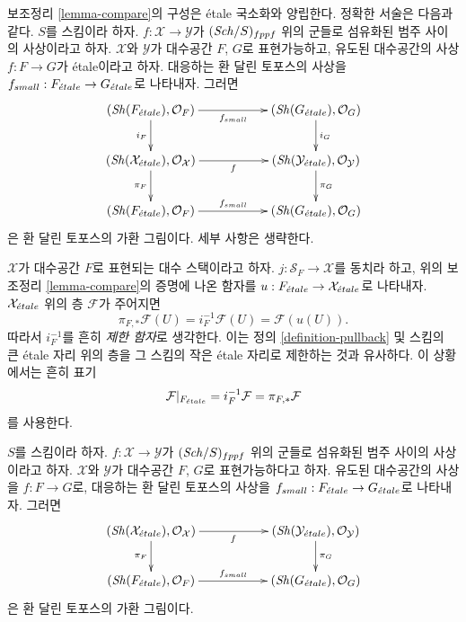 \begin{remark}
\label{remark-compare}
보조정리 \ref{lemma-compare}의 구성은 \'etale 국소화와 양립한다.
정확한 서술은 다음과 같다. $S$를 스킴이라 하자.
$f : \mathcal{X} \to \mathcal{Y}$가 $(\mathit{Sch}/S)_{fppf}$ 위의
군들로 섬유화된 범주 사이의 사상이라고 하자.
$\mathcal{X}$와 $\mathcal{Y}$가 대수공간 $F$, $G$로 표현가능하고,
유도된 대수공간의 사상 $f : F \to G$가 \'etale이라고 하자.
대응하는 환 달린 토포스의 사상을
$f_{small} : F_{\acute{e}tale} \to G_{\acute{e}tale}$로 나타내자. 그러면
$$
\xymatrix{
(\Sh(F_\etale), \mathcal{O}_F) \ar[rr]_{f_{small}} \ar[d]_{i_F} & &
(\Sh(G_\etale), \mathcal{O}_G) \ar[d]^{i_G} \\
(\Sh(\mathcal{X}_\etale), \mathcal{O}_\mathcal{X})
\ar[d]_{\pi_F} \ar[rr]_f & &
(\Sh(\mathcal{Y}_\etale), \mathcal{O}_\mathcal{Y}) \ar[d]^{\pi_G} \\
(\Sh(F_\etale), \mathcal{O}_F) \ar[rr]^{f_{small}} & &
(\Sh(G_\etale), \mathcal{O}_G)
}
$$
은 환 달린 토포스의 가환 그림이다. 세부 사항은 생략한다.
\end{remark}

\noindent
$\mathcal{X}$가 대수공간 $F$로 표현되는 대수 스택이라고 하자.
$j : \mathcal{S}_F \to \mathcal{X}$를 동치라 하고,
위의 보조정리 \ref{lemma-compare}의 증명에 나온 함자를
$u : F_{\acute{e}tale} \to \mathcal{X}_{\acute{e}tale}$로 나타내자.
$\mathcal{X}_{\acute{e}tale}$ 위의 층 $\mathcal{F}$가 주어지면
$$
\pi_{F, *}\mathcal{F}(U) = i_F^{-1}\mathcal{F}(U) = \mathcal{F}(u(U)).
$$
따라서 $i_F^{-1}$를 흔히 {\it 제한 함자}로 생각한다. 이는 정의
\ref{definition-pullback} 및 스킴의 큰 \'etale 자리 위의 층을
그 스킴의 작은 \'etale 자리로 제한하는 것과 유사하다.
이 상황에서는 흔히 표기
\begin{equation}
\label{equation-restrict}
\mathcal{F}|_{F_{\acute{e}tale}} = i_F^{-1}\mathcal{F} = \pi_{F, *}\mathcal{F}
\end{equation}
를 사용한다.

\begin{lemma}
\label{lemma-compare-morphism}
$S$를 스킴이라 하자. $f : \mathcal{X} \to \mathcal{Y}$가
$(\mathit{Sch}/S)_{fppf}$ 위의 군들로 섬유화된 범주 사이의 사상이라고 하자.
$\mathcal{X}$와 $\mathcal{Y}$가 대수공간 $F$, $G$로 표현가능하다고 하자.
유도된 대수공간의 사상을 $f : F \to G$로, 대응하는 환 달린 토포스의
사상을 $f_{small} : F_{\acute{e}tale} \to G_{\acute{e}tale}$로 나타내자. 그러면
$$
\xymatrix{
(\Sh(\mathcal{X}_\etale), \mathcal{O}_\mathcal{X})
\ar[d]_{\pi_F} \ar[rr]_f & &
(\Sh(\mathcal{Y}_\etale), \mathcal{O}_\mathcal{Y}) \ar[d]^{\pi_G} \\
(\Sh(F_\etale), \mathcal{O}_F) \ar[rr]^{f_{small}} & &
(\Sh(G_\etale), \mathcal{O}_G)
}
$$
은 환 달린 토포스의 가환 그림이다.
\end{lemma}

